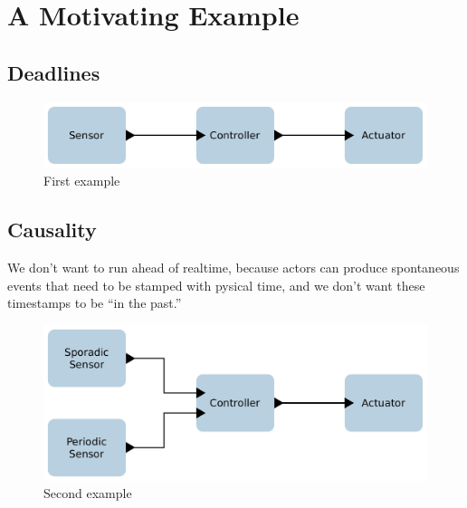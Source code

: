 \documentclass[sigconf]{acmart}
\begin{document}
% 


\section{A Motivating Example}

\subsection{Deadlines}
\begin{figure}[ht]
 \centering
 \includegraphics[width=\linewidth]{img/example-1}
 \caption{First example}
 \label{fig:example-1}
\end{figure}

\subsection{Causality}
We don't want to run ahead of realtime, because actors can produce spontaneous events that need to be stamped with 
pysical time, and we don't want these timestamps to be ``in the past.''

\begin{figure}[ht]
 \centering
 \includegraphics[width=\linewidth]{img/example-2}
 \caption{Second example}
 \label{fig:example-2}
\end{figure}
\end{document}
